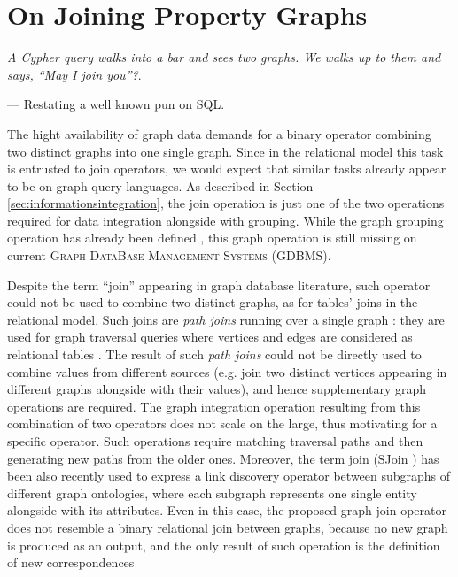 \chapter{On Joining Property Graphs}\label{cha:join}
\epigraph{\textit{A Cypher query walks into a bar and sees two graphs. We walks up to them and says, ``May I join you''?}.}{--- Restating a well known pun on SQL.}

The hight availability of graph data demands for a binary operator combining two distinct graphs into one single graph.
Since in the relational model this task is entrusted to join operators, we would expect that similar
tasks already appear to be on graph query languages. As described in Section \ref{sec:informationsintegration}, the join operation is just one of the two operations required for data integration alongside with grouping. While the graph grouping operation has already been defined \cite{JunghannsPR17}, this graph operation is still missing on current \textsc{Graph DataBase Management Systems} (GDBMS).

Despite the term ``join'' appearing in graph database literature, such operator could not be used to
combine two distinct graphs, as for tables' joins in the relational model. Such joins are
\textit{path joins} running over a single graph  \cite{Aberger}: they are used for graph
traversal queries \cite{Gao,MartonSV17} where vertices and edges are considered as relational
tables \cite{SQLGraph,Neo4jAlg}.
The result of such \textit{path joins} could not be directly used to combine values from different sources (e.g. join
two distinct vertices appearing in different graphs alongside with their values), and hence supplementary
graph operations are required.
The graph integration operation resulting from this combination
of two operators does not scale on the large, thus motivating for a specific operator.
Such operations require matching traversal paths and then generating new paths from the older ones. Moreover, the term join (SJoin \cite{SJoin}) has been also recently used to express a link discovery operator between subgraphs of different graph ontologies, where each subgraph represents one single entity alongside with its attributes. Even in this case, the proposed graph join operator does not resemble a binary relational join between graphs, because no new graph is produced as an output, and the only result of such operation is the definition of new correspondences


